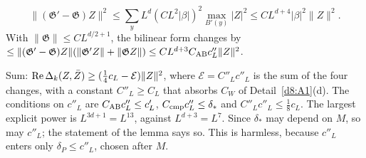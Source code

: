 \begin{detail}
\begin{itemize}
\[
\|(\mathfrak G'-\mathfrak G)Z\|^2\le\sum_yL^d(CL^2|\beta|)^2\max_{B'(y)}|Z|^2\le CL^{d+4}|\beta|^2\|Z\|^2 .
\]
With $\|\mathfrak G\|\le CL^{d/2+1}$, the bilinear form changes by $\le\|(\mathfrak G'-\mathfrak G)Z\|(\|\mathfrak G'Z\|+\|\mathfrak GZ\|)\le CL^{d+3}C_{\rm AB}c''_L\|Z\|^2$.
\end{itemize}
Sum: $\operatorname{Re}\Delta_k(Z,\bar Z)\ge(\frac14c_L-\mathcal E)\|Z\|^2$, where $\mathcal E=C''_Lc''_L$ is the sum of the four changes, with a constant $C''_L\ge C_L$ that absorbs $C_W$ of Detail~\ref{d8:A1}(d). The conditions on $c''_L$ are $C_{\rm AB}c''_L\le c'_L$, $C_{\rm cmp}c''_L\le\delta_*$ and $C''_Lc''_L\le\frac18c_L$. The largest explicit power is $L^{3d+1}=L^{13}$, against $L^{d+3}=L^7$. Since $\delta_*$ may depend on $M$, so may $c''_L$; the statement of the lemma says so. This is harmless, because $c''_L$ enters only $\delta_P\le c''_L$, chosen after $M$.
\end{detail}

